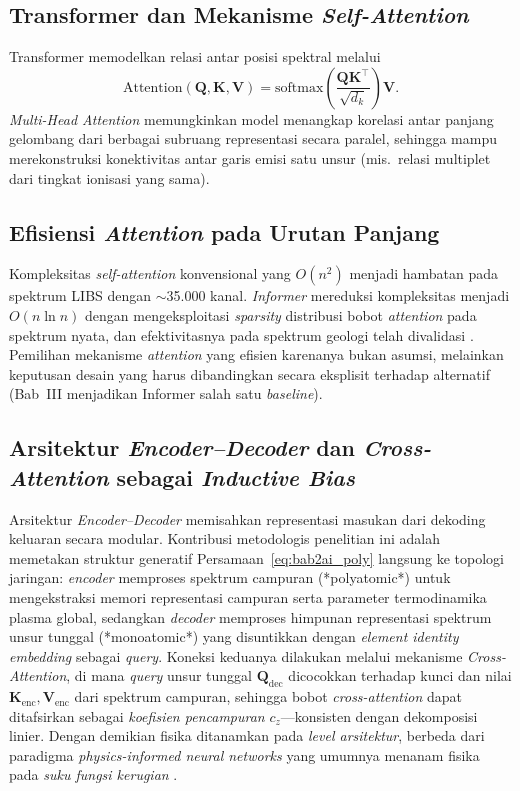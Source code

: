 \subsection{Transformer dan Mekanisme \textit{Self-Attention}}
Transformer \citep{vaswani_attention_2017} memodelkan relasi antar posisi spektral melalui
\begin{equation} \label{eq:bab2ai_attention}
\mathrm{Attention}(\mathbf{Q},\mathbf{K},\mathbf{V}) = \mathrm{softmax}\!\left(\frac{\mathbf{Q}\mathbf{K}^\top}{\sqrt{d_k}}\right)\mathbf{V}.
\end{equation}
\textit{Multi-Head Attention} memungkinkan model menangkap korelasi antar panjang gelombang dari berbagai subruang representasi secara paralel, sehingga mampu merekonstruksi konektivitas antar garis emisi satu unsur (mis.\ relasi multiplet dari tingkat ionisasi yang sama).

\subsection{Efisiensi \textit{Attention} pada Urutan Panjang}
Kompleksitas \textit{self-attention} konvensional yang $O(n^2)$ menjadi hambatan pada spektrum LIBS dengan $\sim$35.000 kanal. \textit{Informer} \citep{zhou_informer_2021} mereduksi kompleksitas menjadi $O(n \ln n)$ dengan mengeksploitasi \textit{sparsity} distribusi bobot \textit{attention} pada spektrum nyata, dan efektivitasnya pada spektrum geologi telah divalidasi \citep{walidain_informer-based_2026}. Pemilihan mekanisme \textit{attention} yang efisien karenanya bukan asumsi, melainkan keputusan desain yang harus dibandingkan secara eksplisit terhadap alternatif (Bab~III menjadikan Informer salah satu \textit{baseline}).

\subsection{Arsitektur \textit{Encoder--Decoder} dan \textit{Cross-Attention} sebagai \textit{Inductive Bias}}
Arsitektur \textit{Encoder--Decoder} memisahkan representasi masukan dari dekoding keluaran secara modular. Kontribusi metodologis penelitian ini adalah memetakan struktur generatif Persamaan~\ref{eq:bab2ai_poly} langsung ke topologi jaringan: \textit{encoder} memproses spektrum campuran (*polyatomic*) untuk mengekstraksi memori representasi campuran serta parameter termodinamika plasma global, sedangkan \textit{decoder} memproses himpunan representasi spektrum unsur tunggal (*monoatomic*) yang disuntikkan dengan \textit{element identity embedding} sebagai \textit{query}. Koneksi keduanya dilakukan melalui mekanisme \textit{Cross-Attention}, di mana \textit{query} unsur tunggal $\mathbf{Q}_{\mathrm{dec}}$ dicocokkan terhadap kunci dan nilai $\mathbf{K}_{\mathrm{enc}}, \mathbf{V}_{\mathrm{enc}}$ dari spektrum campuran, sehingga bobot \textit{cross-attention} dapat ditafsirkan sebagai \emph{koefisien pencampuran} $c_z$---konsisten dengan dekomposisi linier. Dengan demikian fisika ditanamkan pada \emph{level arsitektur}, berbeda dari paradigma \textit{physics-informed neural networks} yang umumnya menanam fisika pada \emph{suku fungsi kerugian} \citep{karniadakis_physics-informed_2021, raissi_physics-informed_2019}.


